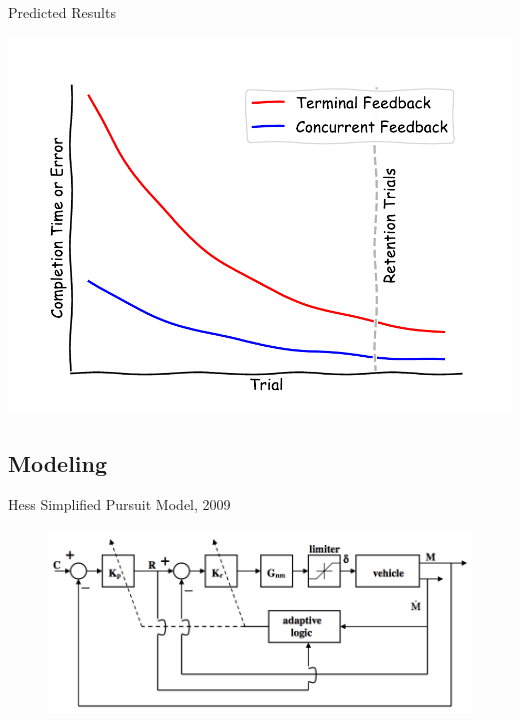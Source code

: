\documentclass[10pt]{beamer}
\begin{document}
\begin{frame}[fragile]{Predicted Results}
  \begin{center}
    \includegraphics[width=\linewidth]{../img/robot_estimate.pdf}
  \end{center}
\end{frame}

\subsection{Modeling}

\begin{frame}[fragile]{Hess Simplified Pursuit Model, 2009~\cite{Hess2009}}
  \begin{figure}[h!]
    \begin{center}
      \includegraphics[width=\linewidth]{./../img/Screen_Shot_2018-08-09_at_4.15.24_PM.png}
    \end{center}
  \end{figure}
\end{frame}
\end{document}
